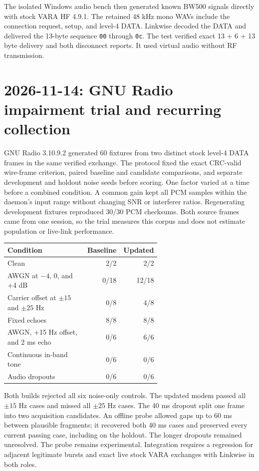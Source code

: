 \documentclass[11pt,a4paper]{article}
\begin{document}
The isolated Windows audio bench then generated known BW500 signals
directly with stock VARA HF 4.9.1. The retained 48 kHz mono WAVs include
the connection request, setup, and level-4 DATA. Linkwise decoded the
DATA and delivered the 13-byte sequence \texttt{00} through \texttt{0c}.
The test verified exact 13 + 6 + 13 byte delivery and both disconnect
reports. It used virtual audio without RF transmission.

\section{2026-11-14: GNU Radio impairment trial and recurring collection}
\label{sec:gnuradio-nov14}

GNU Radio 3.10.9.2 generated 60 fixtures from two distinct stock
level-4 DATA frames in the same verified exchange. The protocol fixed
the exact CRC-valid wire-frame criterion, paired baseline and candidate
comparisons, and separate development and holdout noise seeds before
scoring. One factor varied at a time before a combined condition.
A common gain kept all PCM samples within the daemon's input range
without changing SNR or interferer ratios. Regenerating development
fixtures reproduced 30/30 PCM checksums. Both source frames came from
one session, so the trial measures this corpus and does not estimate
population or live-link performance.

\begin{center}
\begin{tabular}{@{}p{0.61\linewidth}rr@{}}
\toprule
Condition & Baseline & Updated \\
\midrule
Clean & 2/2 & 2/2 \\
AWGN at $-4$, 0, and +4 dB & 0/18 & 12/18 \\
Carrier offset at $\pm15$ and $\pm25$ Hz & 0/8 & 4/8 \\
Fixed echoes & 8/8 & 8/8 \\
AWGN, +15 Hz offset, and 2 ms echo & 0/6 & 6/6 \\
Continuous in-band tone & 0/6 & 0/6 \\
Audio dropouts & 0/6 & 0/6 \\
\bottomrule
\end{tabular}
\end{center}

Both builds rejected all six noise-only controls. The updated modem
passed all $\pm15$ Hz cases and missed all $\pm25$ Hz cases. The 40 ms
dropout split one frame into two acquisition candidates. An offline
probe allowed gaps up to 60 ms between plausible fragments; it
recovered both 40 ms cases and preserved every current passing case,
including on the holdout. The longer dropouts remained unresolved.
The probe remains experimental. Integration requires a regression
for adjacent legitimate bursts and exact live stock VARA exchanges
with Linkwise in both roles.
\end{document}
